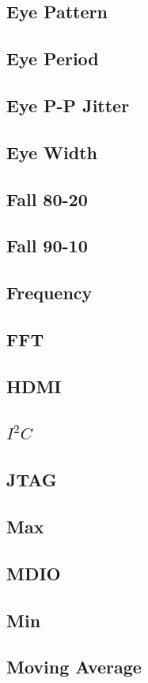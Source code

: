 \documentclass[11pt]{article}
\begin{document}
\subsection{Eye Pattern}
\subsection{Eye Period}
\subsection{Eye P-P Jitter}
\subsection{Eye Width}
\subsection{Fall 80-20}
\subsection{Fall 90-10}
\subsection{Frequency}
\subsection{FFT}
\subsection{HDMI}
\label{filter:hdmi}
\subsection{$I^2C$}
\subsection{JTAG}
\subsection{Max}
\subsection{MDIO}
\subsection{Min}
\subsection{Moving Average}
\end{document}
